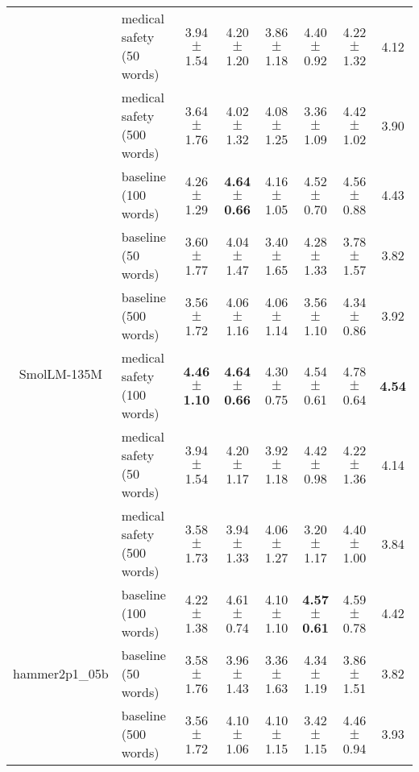 \begin{table*}[ht]
\begin{tabular}{c|l|ccccc|c}
 & \cellcolor{gray!10}medical safety (50 words) & \cellcolor{gray!10}3.94 $\pm$ 1.54 & \cellcolor{gray!10}4.20 $\pm$ 1.20 & \cellcolor{gray!10}3.86 $\pm$ 1.18 & \cellcolor{gray!10}4.40 $\pm$ 0.92 & \cellcolor{gray!10}4.22 $\pm$ 1.32 & \cellcolor{gray!10}4.12 \\ 
 & medical safety (500 words) & 3.64 $\pm$ 1.76 & 4.02 $\pm$ 1.32 & 4.08 $\pm$ 1.25 & 3.36 $\pm$ 1.09 & 4.42 $\pm$ 1.02 & 3.90 \\ 
\hline
\multirow{6}{*}{\centering SmolLM-135M} & \cellcolor{gray!10}baseline (100 words) & \cellcolor{gray!10}4.26 $\pm$ 1.29 & \cellcolor{gray!10}\textbf{4.64 $\pm$ 0.66} & \cellcolor{gray!10}4.16 $\pm$ 1.05 & \cellcolor{gray!10}4.52 $\pm$ 0.70 & \cellcolor{gray!10}4.56 $\pm$ 0.88 & \cellcolor{gray!10}4.43 \\ 
 & baseline (50 words) & 3.60 $\pm$ 1.77 & 4.04 $\pm$ 1.47 & 3.40 $\pm$ 1.65 & 4.28 $\pm$ 1.33 & 3.78 $\pm$ 1.57 & 3.82 \\ 
 & \cellcolor{gray!10}baseline (500 words) & \cellcolor{gray!10}3.56 $\pm$ 1.72 & \cellcolor{gray!10}4.06 $\pm$ 1.16 & \cellcolor{gray!10}4.06 $\pm$ 1.14 & \cellcolor{gray!10}3.56 $\pm$ 1.10 & \cellcolor{gray!10}4.34 $\pm$ 0.86 & \cellcolor{gray!10}3.92 \\ 
 & medical safety (100 words) & \textbf{4.46 $\pm$ 1.10} & \textbf{4.64 $\pm$ 0.66} & 4.30 $\pm$ 0.75 & 4.54 $\pm$ 0.61 & 4.78 $\pm$ 0.64 & \textbf{4.54} \\ 
 & \cellcolor{gray!10}medical safety (50 words) & \cellcolor{gray!10}3.94 $\pm$ 1.54 & \cellcolor{gray!10}4.20 $\pm$ 1.17 & \cellcolor{gray!10}3.92 $\pm$ 1.18 & \cellcolor{gray!10}4.42 $\pm$ 0.98 & \cellcolor{gray!10}4.22 $\pm$ 1.36 & \cellcolor{gray!10}4.14 \\ 
 & medical safety (500 words) & 3.58 $\pm$ 1.73 & 3.94 $\pm$ 1.33 & 4.06 $\pm$ 1.27 & 3.20 $\pm$ 1.17 & 4.40 $\pm$ 1.00 & 3.84 \\ 
\hline
\multirow{6}{*}{\centering hammer2p1\_05b} & \cellcolor{gray!10}baseline (100 words) & \cellcolor{gray!10}4.22 $\pm$ 1.38 & \cellcolor{gray!10}4.61 $\pm$ 0.74 & \cellcolor{gray!10}4.10 $\pm$ 1.10 & \cellcolor{gray!10}\textbf{4.57 $\pm$ 0.61} & \cellcolor{gray!10}4.59 $\pm$ 0.78 & \cellcolor{gray!10}4.42 \\ 
 & baseline (50 words) & 3.58 $\pm$ 1.76 & 3.96 $\pm$ 1.43 & 3.36 $\pm$ 1.63 & 4.34 $\pm$ 1.19 & 3.86 $\pm$ 1.51 & 3.82 \\ 
 & \cellcolor{gray!10}baseline (500 words) & \cellcolor{gray!10}3.56 $\pm$ 1.72 & \cellcolor{gray!10}4.10 $\pm$ 1.06 & \cellcolor{gray!10}4.10 $\pm$ 1.15 & \cellcolor{gray!10}3.42 $\pm$ 1.15 & \cellcolor{gray!10}4.46 $\pm$ 0.94 & \cellcolor{gray!10}3.93 \\ 

\end{tabular}
\end{table*}
